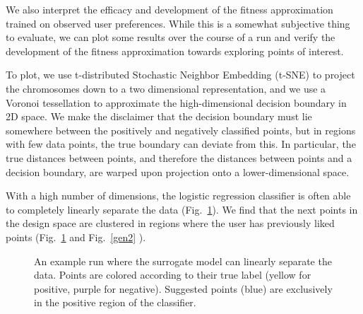 \documentclass[conference]{IEEEtran}
\begin{document}
We also interpret the efficacy and development of the fitness approximation
trained on observed user preferences. While this is a somewhat subjective thing
to evaluate, we can plot some results over the course of a run and verify the
development of the fitness approximation towards exploring points of interest.

To plot, we use t-distributed Stochastic Neighbor Embedding (t-SNE)
\cite{tsne} to project the chromosomes down to a two dimensional
representation, and we use a Voronoi tessellation \cite{hi-d-viz} to
approximate the high-dimensional decision boundary in 2D space. We make the
disclaimer that the decision boundary must lie somewhere between the positively
and negatively classified points, but in regions with few data points, the true
boundary can deviate from this. In particular, the true distances between
points, and therefore the distances between points and a decision boundary, are
warped upon projection onto a lower-dimensional space.

With a high number of dimensions, the logistic regression classifier is often
able to completely linearly separate the data (Fig.~\ref{gen1}).
We find that the next points in the design space are clustered in regions where
the user has previously liked points (Fig.~\ref{gen1} and
Fig.~\ref{gen2} ).

\begin{figure}[htbp]
    \caption{An example run where the surrogate model can linearly separate the data.
        Points are colored according to their true label (yellow for
        positive, purple for negative). Suggested points (blue) are exclusively in the positive
        region of the
        classifier.}
    \label{gen1}
\end{figure}
\end{document}
